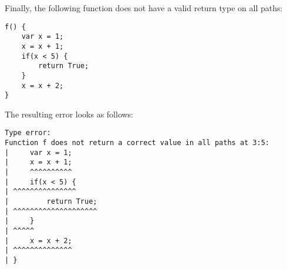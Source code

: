 Finally, the following function does not have a valid return type on all paths:

\begin{lstlisting}
f() {
    var x = 1;
    x = x + 1;
    if(x < 5) {
        return True;
    }
    x = x + 2;
}
\end{lstlisting}

The resulting error looks as follows:

\begin{lstlisting}[language={}]
Type error:
Function f does not return a correct value in all paths at 3:5:
|     var x = 1;
|     x = x + 1;
|     ^^^^^^^^^^
|     if(x < 5) {
| ^^^^^^^^^^^^^^^
|         return True;
| ^^^^^^^^^^^^^^^^^^^^
|     }
| ^^^^^
|     x = x + 2;
| ^^^^^^^^^^^^^^
| }
\end{lstlisting}
